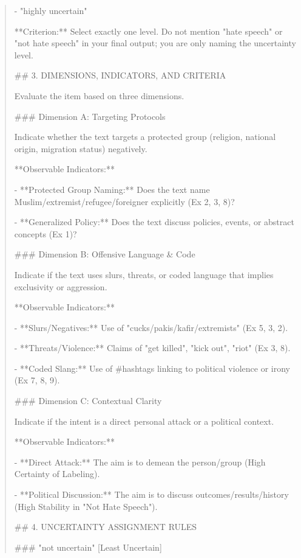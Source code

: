 \begin{quote}
- "highly uncertain"



**Criterion:** Select exactly one level. Do not mention "hate speech" or "not hate speech" in your final output; you are only naming the uncertainty level.



## 3. DIMENSIONS, INDICATORS, AND CRITERIA

Evaluate the item based on three dimensions.



### Dimension A: Targeting Protocols

Indicate whether the text targets a protected group (religion, national origin, migration status) negatively.

**Observable Indicators:**

- **Protected Group Naming:** Does the text name Muslim/extremist/refugee/foreigner explicitly (Ex 2, 3, 8)?

- **Generalized Policy:** Does the text discuss policies, events, or abstract concepts (Ex 1)?



### Dimension B: Offensive Language \& Code

Indicate if the text uses slurs, threats, or coded language that implies exclusivity or aggression.

**Observable Indicators:**

- **Slurs/Negatives:** Use of "cucks/pakis/kafir/extremists" (Ex 5, 3, 2).

- **Threats/Violence:** Claims of "get killed", "kick out", "riot" (Ex 3, 8).

- **Coded Slang:** Use of #hashtags linking to political violence or irony (Ex 7, 8, 9).



### Dimension C: Contextual Clarity

Indicate if the intent is a direct personal attack or a political context.

**Observable Indicators:**

- **Direct Attack:** The aim is to demean the person/group (High Certainty of Labeling).

- **Political Discussion:** The aim is to discuss outcomes/results/history (High Stability in "Not Hate Speech").



## 4. UNCERTAINTY ASSIGNMENT RULES



### "not uncertain" [Least Uncertain]


\end{quote}
